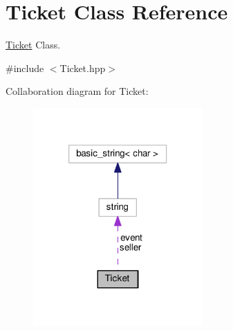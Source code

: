 \hypertarget{class_ticket}{\section{Ticket Class Reference}
\label{class_ticket}
}


\hyperlink{class_ticket}{Ticket} Class.  




{\ttfamily \#include $<$Ticket.\-hpp$>$}



Collaboration diagram for Ticket\-:\nopagebreak
\begin{figure}[H]
\begin{center}
\leavevmode
\includegraphics[width=184pt]{class_ticket__coll__graph}
\end{center}
\end{figure}
